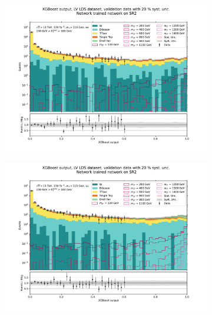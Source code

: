 \documentclass[12pt, a4paper]{book}
\begin{document}
\begin{figure}[!ht]
	\centering
	\begin{subfigure}[b]{0.49\textwidth}
      \centering
      \includegraphics[width=1\textwidth]{XGBoost/Model_independent/100-150/LV_LDS/VAL_ee.pdf}
   \end{subfigure}
   \hfill
   \begin{subfigure}[b]{0.49\textwidth}
      \centering
      \includegraphics[width=1\textwidth]{XGBoost/Model_independent/100-150/LV_LDS/VAL_uu.pdf}
   \end{subfigure}
   \hfill
   \begin{subfigure}[b]{0.49\textwidth}
      \centering

\end{subfigure}
\end{figure}
\end{document}

